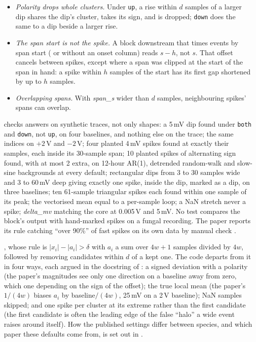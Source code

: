 \begin{itemize}
  measured downstream.
\item \emph{Polarity drops whole clusters.} Under \texttt{up}, a rise within $d$ samples of a
  larger dip shares the dip's cluster, takes its sign, and is dropped; \texttt{down} does
  the same to a dip beside a larger rise.
\item \emph{The span start is not the spike.} A block downstream that times events by span
  start ( or  without an
  onset column) reads $s - h$, not $s$. That offset cancels between spikes, except where a
  span was clipped at the start of the span in hand: a spike within $h$ samples of the start
  has its first gap shortened by up to $h$ samples.
\item \emph{Overlapping spans.} With \emph{span\_s} wider than $d$ samples, neighbouring
  spikes' spans can overlap.
\end{itemize}

 checks answers on synthetic traces, not only shapes: a 5\,mV
dip found under \texttt{both} and \texttt{down}, not \texttt{up}, on four baselines, and
nothing else on the trace; the same indices on $+2$\,V and $-2$\,V; four planted 4\,mV
spikes found at exactly their samples, each inside its 30-sample span; 10 planted spikes of
alternating sign found, with at most 2 extra, on 12-hour AR(1), detrended random-walk and
slow-sine backgrounds at every default; rectangular dips from 3 to 30 samples wide and 3 to
60\,mV deep giving exactly one spike, inside the dip, marked as a dip, on three baselines;
ten 61-sample triangular spikes each found within one sample of its peak; the vectorised mean
equal to a per-sample loop; a NaN stretch never a spike; \emph{delta\_mv} matching the core
at 0.005\,V and 5\,mV. No test compares the block's output with hand-marked spikes on a
fungal recording. The paper reports its rule catching ``over 90\%'' of fast spikes on its
own data by manual check \citep{adamatzky2023multiscalar}.

\citet{adamatzky2023multiscalar}, whose rule is $|x_i| - |a_i| > \delta$ with $a_i$ a sum
over $4w+1$ samples divided by $4w$, followed by removing candidates within $d$ of a kept
one. The code departs from it in four ways, each argued in the docstring of
: a signed deviation with a polarity (the paper's magnitudes see
only one direction on a baseline away from zero, which one depending on the sign of the
offset); the true local mean (the paper's $1/(4w)$ biases $a_i$ by baseline$/(4w)$, 25\,mV on
a 2\,V baseline); NaN samples skipped; and one spike per cluster at its extreme rather than
the first candidate (the first candidate is often the leading edge of the false ``halo'' a
wide event raises around itself). How the published settings differ between species, and
which paper these defaults come from, is set out in
.

